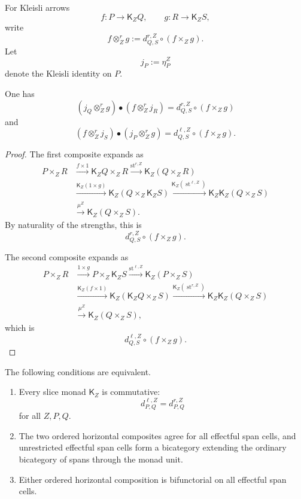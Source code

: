 For Kleisli arrows
\[
    f:P\to\mathsf K_ZQ,
    \qquad
    g:R\to\mathsf K_ZS,
\]
write
\[
    f\otimes_Z^rg
    :=
    d^{r,Z}_{Q,S}\circ(f\times_Zg).
\]
Let
\[
    j_P:=\eta^Z_P
\]
denote the Kleisli identity on \(P\).

\begin{lemma}
\label{lem:sequential-fubini-decompositions}
One has
\[
    (j_Q\otimes_Z^rg)
    \bullet
    (f\otimes_Z^rj_R)
    =
    d^{r,Z}_{Q,S}\circ(f\times_Zg)
\]
and
\[
    (f\otimes_Z^rj_S)
    \bullet
    (j_P\otimes_Z^rg)
    =
    d^{\ell,Z}_{Q,S}\circ(f\times_Zg).
\]
\end{lemma}

\begin{proof}
The first composite expands as
\[
\begin{aligned}
P\times_ZR
&\xrightarrow{f\times1}
\mathsf K_ZQ\times_ZR
\xrightarrow{\operatorname{st}^{r,Z}}
\mathsf K_Z(Q\times_ZR)
\\
&\xrightarrow{\mathsf K_Z(1\times g)}
\mathsf K_Z(Q\times_Z\mathsf K_ZS)
\xrightarrow{\mathsf K_Z(\operatorname{st}^{\ell,Z})}
\mathsf K_Z\mathsf K_Z(Q\times_ZS)
\\
&\xrightarrow{\mu^Z}
\mathsf K_Z(Q\times_ZS).
\end{aligned}
\]
By naturality of the strengths, this is
\[
    d^{r,Z}_{Q,S}\circ(f\times_Zg).
\]

The second composite expands as
\[
\begin{aligned}
P\times_ZR
&\xrightarrow{1\times g}
P\times_Z\mathsf K_ZS
\xrightarrow{\operatorname{st}^{\ell,Z}}
\mathsf K_Z(P\times_ZS)
\\
&\xrightarrow{\mathsf K_Z(f\times1)}
\mathsf K_Z(\mathsf K_ZQ\times_ZS)
\xrightarrow{\mathsf K_Z(\operatorname{st}^{r,Z})}
\mathsf K_Z\mathsf K_Z(Q\times_ZS)
\\
&\xrightarrow{\mu^Z}
\mathsf K_Z(Q\times_ZS),
\end{aligned}
\]
which is
\[
    d^{\ell,Z}_{Q,S}\circ(f\times_Zg).
\]
\end{proof}

\begin{theorem}
\label{thm:effectful-span-interchange}
The following conditions are equivalent.
\begin{enumerate}
    \item Every slice monad \(\mathsf K_Z\) is commutative:
    \[
        d^{\ell,Z}_{P,Q}
        =
        d^{r,Z}_{P,Q}
    \]
    for all \(Z,P,Q\).

    \item The two ordered horizontal composites agree for all effectful span
    cells, and unrestricted effectful span cells form a bicategory extending
    the ordinary bicategory of spans through the monad unit.

    \item Either ordered horizontal composition is bifunctorial on all
    effectful span cells.
\end{enumerate}
\end{theorem}

